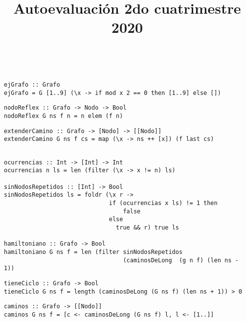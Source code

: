 \documentclass[leqno, 12pt, twoside, letterpaper]{book}
\date{\vspace{-5ex}}
\title{Autoevaluación 2do cuatrimestre 2020}
\begin{document}
\maketitle
\tableofcontents

\newpage

\\


\begin{verbatim}
ejGrafo :: Grafo
ejGrafo = G [1..9] (\x -> if mod x 2 == 0 then [1..9] else [])
\end{verbatim}

\begin{verbatim}
nodoReflex :: Grafo -> Nodo -> Bool
nodoReflex G ns f n = n elem (f n)
\end{verbatim}

\begin{verbatim}
extenderCamino :: Grafo -> [Nodo] -> [[Nodo]]
extenderCamino G ns f cs = map (\x -> ns ++ [x]) (f last cs)
\end{verbatim}

\begin{verbatim}

ocurrencias :: Int -> [Int] -> Int
ocurrencias n ls = len (filter (\x -> x != n) ls)

sinNodosRepetidos :: [Int] -> Bool
sinNodosRepetidos ls = foldr (\x r ->
                              if (ocurrencias x ls) != 1 then
                                  false
                              else
                                true && r) true ls

hamiltoniano :: Grafo -> Bool
hamiltoniano G ns f = len (filter sinNodosRepetidos
                                  (caminosDeLong  (g n f) (len ns - 1))
\end{verbatim}

\begin{verbatim}
tieneCiclo :: Grafo -> Bool
tieneCiclo G ns f = length (caminosDeLong (G ns f) (len ns + 1)) > 0
\end{verbatim}


\begin{verbatim}
caminos :: Grafo -> [[Nodo]]
caminos G ns f = [c <- caminosDeLong (G ns f) l, l <- [1..]]
\end{verbatim}

\newpage

\\
\end{document}
